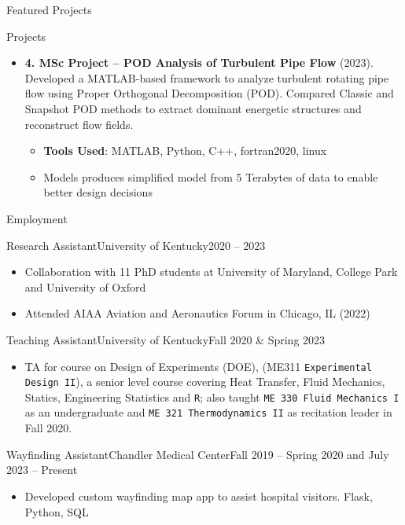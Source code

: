 \documentclass[]{mcdowellcv}
\begin{document}
\begin{cvsection}{Featured Projects}
\begin{cvsubsection}{Projects}{}{}
\begin{itemize}
\item \textbf{4. MSc Project – POD Analysis of Turbulent Pipe Flow} (2023). Developed a MATLAB-based framework to analyze turbulent rotating pipe flow using Proper Orthogonal Decomposition (POD). Compared Classic and Snapshot POD methods to extract dominant energetic structures and reconstruct flow fields.
  \begin{itemize}
    \item \textbf{Tools Used}: MATLAB, Python, C++, fortran2020, linux
    \item Models produces simplified model from 5 Terabytes of data to enable better design decisions
  \end{itemize}
\end{itemize}
  \end{cvsubsection}
\end{cvsection}


\begin{cvsection}{Employment}
  \begin{cvsubsection}{Research Assistant}{University of Kentucky}{2020 -- 2023}
    \begin{itemize}
      \item Collaboration with 11 PhD students at University of Maryland, College Park and University of Oxford
      \item Attended AIAA Aviation and Aeronautics Forum in Chicago, IL (2022)
    \end{itemize}
  \end{cvsubsection}

  \begin{cvsubsection}{Teaching Assistant}{University of Kentucky}{Fall 2020 \& Spring 2023}
    \begin{itemize}
      \item TA for course on Design of Experiments (DOE), (ME311 \texttt{Experimental Design II}), a senior level course covering Heat Transfer, Fluid Mechanics, Statics, Engineering Statistics and \texttt{R}; also taught \texttt{ME 330 Fluid Mechanics I} as an undergraduate and \texttt{ME 321 Thermodynamics II} as recitation leader in Fall 2020.
    \end{itemize}
  \end{cvsubsection}

  \begin{cvsubsection}{Wayfinding Assistant}{Chandler Medical Center}{Fall 2019 -- Spring 2020 and July 2023 -- Present}
    \begin{itemize}
      \item Developed custom wayfinding map app to assist hospital visitors. Flask, Python, SQL
    \end{itemize}
  \end{cvsubsection}
\end{cvsection}
\end{document}
